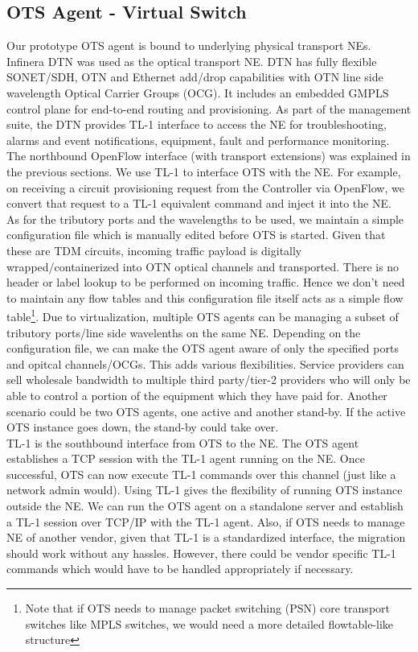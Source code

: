\documentclass{sig-alternate-10pt}
\begin{document}
	\subsection{OTS Agent - Virtual Switch}
	\label{sec:otvs}
	Our prototype OTS agent is bound to underlying physical transport NEs. Infinera DTN \cite{dtn} was used
	as the optical transport NE. DTN has fully flexible SONET/SDH, OTN and Ethernet add/drop
	capabilities with OTN \cite{otn} line side wavelength Optical Carrier Groups (OCG). It includes an
	embedded GMPLS control plane for end-to-end routing and provisioning. As part of the management suite,
	the DTN provides TL-1 interface to access the NE for troubleshooting, alarms and event
	notifications, equipment, fault and performance monitoring. The northbound OpenFlow interface (with
	transport extensions) was explained in the previous sections. We use TL-1 to interface OTS with the NE.
	For example, on receiving a circuit provisioning request from the Controller via OpenFlow, we convert
	that request to a TL-1 equivalent command and inject it into the NE. \\

	As for the tributory ports and the wavelengths to be used, we maintain a simple configuration file which
	is manually edited before OTS is started. Given that these are TDM circuits, incoming traffic payload is
	digitally wrapped/containerized into OTN optical channels and transported. There is no header or label
	lookup to be performed on incoming traffic. Hence we don't need to maintain any flow tables and this
	configuration file itself acts as a simple flow table\footnote{Note that if OTS needs to manage packet
	switching (PSN) core transport switches like MPLS switches, we would need a more detailed flowtable-like
	structure}. Due to virtualization, multiple OTS agents can be managing a subset of tributory ports/line
	side wavelenths on the same NE. Depending on the configuration file, we can make the OTS agent aware of
	only the specified ports and opitcal channels/OCGs. This adds various flexibilities. Service providers
	can sell wholesale bandwidth to multiple third party/tier-2 providers who will only be able to control a
	portion of the equipment which they have paid for. Another scenario could be two OTS agents, one active
	and another stand-by. If the active OTS instance goes down, the stand-by could take over.\\

	TL-1 is the southbound interface from OTS to the NE. The OTS agent establishes a TCP session with
	the TL-1 agent running on the NE. Once successful, OTS can now execute TL-1 commands over this
	channel (just like a network admin would). Using TL-1 gives the flexibility of running OTS instance
	outside the NE. We can run the OTS agent on a standalone server and establish a TL-1 session over
	TCP/IP with the TL-1 agent. Also, if OTS needs to manage NE of another vendor, given that TL-1 is a
	standardized interface, the migration should work without any hassles. However, there could be vendor 
	specific TL-1 commands which would have to be handled appropriately if necessary.
\end{document}
